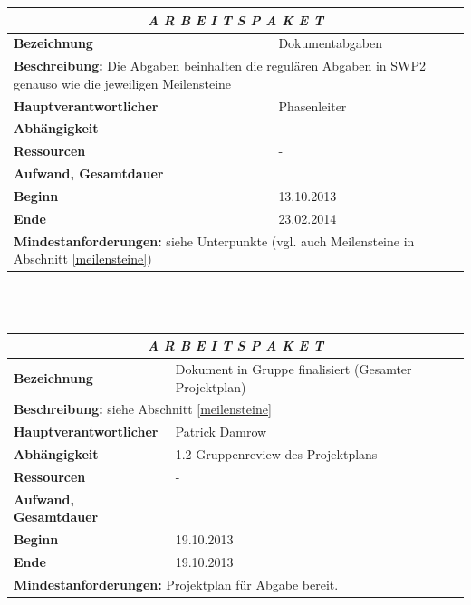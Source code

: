 \documentclass[fontsize=12pt,paper=a4,twoside]{scrartcl}
\begin{document}
\begin{tabular}{p{7.5cm}|p{7.5cm}}\toprule
\multicolumn{2}{c}{\textbf{\textit{A R B E I T S P A K E T \quad 6}}} \\ \toprule \hline
\textbf{Bezeichnung} & Dokumentabgaben\\\hline
\multicolumn{2}{p{15cm}}{\textbf{Beschreibung:} \newline 
Die Abgaben beinhalten die regulären Abgaben in SWP2 genauso wie die jeweiligen Meilensteine}  \\\hline
\textbf{Hauptverantwortlicher} & Phasenleiter \\\hline
\textbf{Abhängigkeit} & -\\\hline
\textbf{Ressourcen} & -\\\hline
\textbf{Aufwand, Gesamtdauer} & \\\hline
\textbf{Beginn} & 13.10.2013 \\\hline
\textbf{Ende} & 23.02.2014\\\hline
\multicolumn{2}{p{15cm}}{\textbf{Mindestanforderungen: } \newline
siehe Unterpunkte (vgl. auch Meilensteine in Abschnitt \ref{meilensteine})}  \\ \toprule
\end{tabular} \\\\

\begin{tabular}{p{7.5cm}|p{7.5cm}}\toprule
\multicolumn{2}{c}{\textbf{\textit{A R B E I T S P A K E T \quad 6.1}}} \\ \toprule \hline
\textbf{Bezeichnung} & Dokument in Gruppe finalisiert (Gesamter Projektplan)\\\hline
\multicolumn{2}{p{15cm}}{\textbf{Beschreibung:} \newline 
siehe Abschnitt \ref{meilensteine} }  \\\hline
\textbf{Hauptverantwortlicher} & Patrick Damrow \\\hline
\textbf{Abhängigkeit} & 1.2 Gruppenreview des Projektplans\\\hline
\textbf{Ressourcen} & -\\\hline
\textbf{Aufwand, Gesamtdauer} & \\\hline
\textbf{Beginn} & 19.10.2013 \\\hline
\textbf{Ende} & 19.10.2013\\\hline
\multicolumn{2}{p{15cm}}{\textbf{Mindestanforderungen: } \newline
Projektplan für Abgabe bereit.}  \\ \toprule
\end{tabular} \\\\
\end{document}
